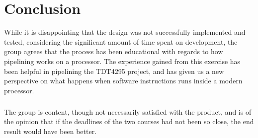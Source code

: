 \chapter{Conclusion}
While it is disappointing that the design was not successfully implemented and
tested, considering the significant amount of time spent on development, the
group agrees that the process has been educational with regards to how pipelining
works on a processor. The experience gained from this exercise has been helpful
in pipelining the TDT4295 project, and has given us a new perspective on what
happens when software instructions runs inside a modern processor.
\paragraph*{}
The group is content, though not necessarily satisfied with the product, and is
of the opinion that if the deadlines of the two courses had not been so close,
the end result would have been better.
